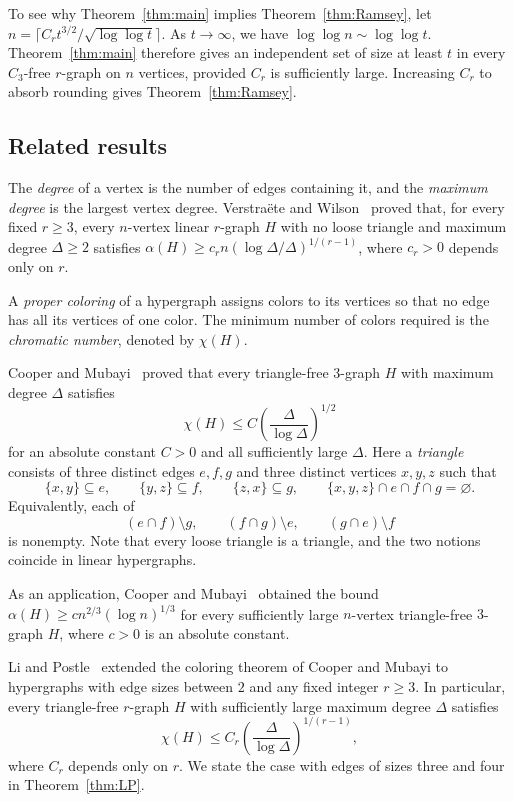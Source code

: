 \documentclass[11pt]{article}
\numberwithin{equation}{section}
\theoremstyle{remark}
\begin{document}
To see why Theorem~\ref{thm:main} implies Theorem~\ref{thm:Ramsey}, let $n=\lceil C_r t^{3/2}/\sqrt{\log\log t}\rceil$. As $t\to\infty$, we have $\log\log n\sim\log\log t$. Theorem~\ref{thm:main} therefore gives an independent set of size at least $t$ in every $C_3$-free $r$-graph on $n$ vertices, provided $C_r$ is sufficiently large. Increasing $C_r$ to absorb rounding gives Theorem~\ref{thm:Ramsey}.

\subsection{Related results}\label{sec:related}
The \emph{degree} of a vertex is the number of edges containing it, and the \emph{maximum degree} is the largest vertex degree. Verstra\"ete and Wilson~\cite[Theorem 1]{VW} proved that, for every fixed $r\ge3$, every $n$-vertex linear $r$-graph $H$ with no loose triangle and maximum degree $\Delta\ge2$ satisfies $\alpha(H)\ge c_r n(\log\Delta/\Delta)^{1/(r-1)}$, where $c_r>0$ depends only on $r$.

A \emph{proper coloring} of a hypergraph assigns colors to its vertices so that no edge has all its vertices of one color. The minimum number of colors required is the \emph{chromatic number}, denoted by $\chi(H)$.

Cooper and Mubayi~\cite[Theorem 2]{CM} proved that every triangle-free $3$-graph $H$ with maximum degree $\Delta$ satisfies
\[
 \chi(H)\le C\left(\frac{\Delta}{\log\Delta}\right)^{1/2}
\]
for an absolute constant $C>0$ and all sufficiently large $\Delta$. Here a \emph{triangle} consists of three distinct edges $e,f,g$ and three distinct vertices $x,y,z$ such that
\[
 \{x,y\}\subseteq e,\qquad \{y,z\}\subseteq f,\qquad
 \{z,x\}\subseteq g,\qquad
 \{x,y,z\}\cap e\cap f\cap g=\varnothing.
\]
Equivalently, each of
\[
 (e\cap f)\setminus g,\qquad
 (f\cap g)\setminus e,\qquad
 (g\cap e)\setminus f
\]
is nonempty. Note that every loose triangle is a triangle, and the two notions coincide in linear hypergraphs.

As an application, Cooper and Mubayi~\cite[Section 1.2]{CM} obtained the bound $\alpha(H)\ge c n^{2/3}(\log n)^{1/3}$ for every sufficiently large $n$-vertex triangle-free $3$-graph $H$, where $c>0$ is an absolute constant.

Li and Postle~\cite[Theorem 1.4]{LP} extended the coloring theorem of Cooper and Mubayi to hypergraphs with edge sizes between $2$ and any fixed integer $r\ge3$. In particular, every triangle-free $r$-graph $H$ with sufficiently large maximum degree $\Delta$ satisfies
\[
 \chi(H)\le C_r\left(\frac{\Delta}{\log\Delta}\right)^{1/(r-1)},
\]
where $C_r$ depends only on $r$. We state the case with edges of sizes three and four in Theorem~\ref{thm:LP}.
\end{document}
